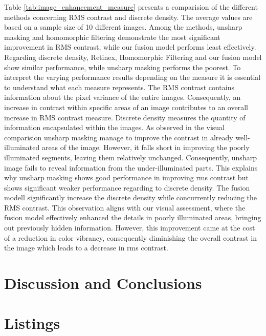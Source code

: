 \documentclass[sigconf]{acmart}
\begin{document}
 
Table \ref{tab:image_enhancement_measure} presents a comparision of the different methods concerning RMS contrast and discrete density. The average values are based on a sample size of 10 different images. Among the methods, unsharp masking and homomorphic filtering demonstrate the most significant improvement in RMS contrast, while our fusion model performs least effectively. Regarding discrete density, Retinex, Homomorphic Filtering and our fusion model show similar performance, while unsharp masking performs the poorest.
To interpret the varying performance results depending on the measure it is essential to understand what each measure represents. The RMS contrast contains information about the pixel variance of the entire images. Consequently, an increase in contrast within specific areas of an image contributes to an overall increase in RMS contrast measure. Discrete density measures the quantity of information encapsulated within the images. As observed in the visual comparision unsharp masking manage to improve the contrast in already well-illuminated areas of the image. However, it falls short in improving the poorly illuminated segments, leaving them relatively unchanged. Consequently, unsharp image fails to reveal information from the under-illuminated parts. This explains why unsharp masking shows good performance in improving rms contrast but shows significant weaker performance regarding to discrete density.
The fusion modell significantly increase the discrete density while concurrently reducing the RMS contrast. This observation aligns with our visual assessment, where the fusion model effectively enhanced the details in poorly illuminated areas, bringing out previously hidden information. However, this improvement came at the cost of a reduction in color vibrancy, consequently diminishing the overall contrast in the image which leads to a decrease in rms contrast.


\section{Discussion and Conclusions}\label{sec:discussion}







\newpage
\appendix

\section{Listings}
\end{document}
